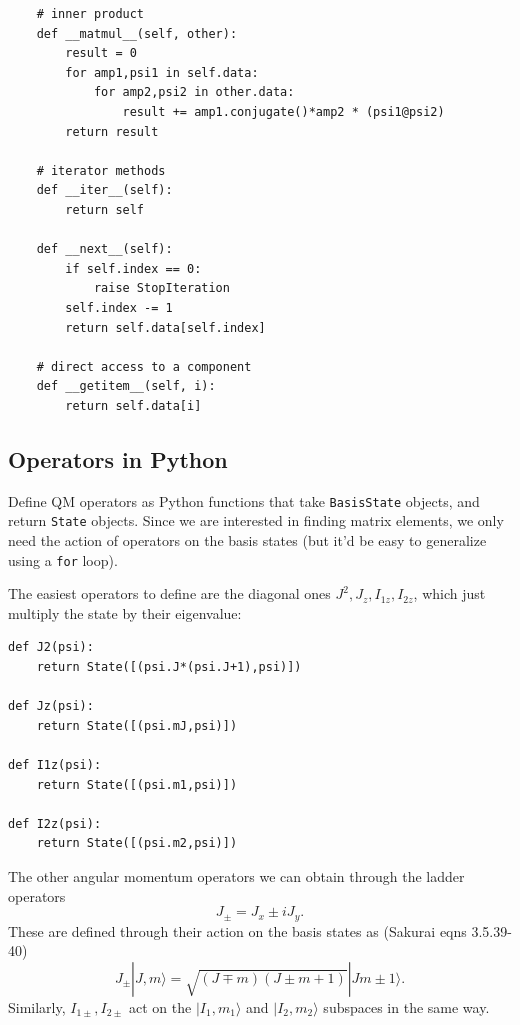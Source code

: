 \begin{lstlisting}
    # inner product
    def __matmul__(self, other):
        result = 0
        for amp1,psi1 in self.data:
            for amp2,psi2 in other.data:
                result += amp1.conjugate()*amp2 * (psi1@psi2)
        return result

    # iterator methods
    def __iter__(self):
        return self
    
    def __next__(self):
        if self.index == 0:
            raise StopIteration
        self.index -= 1
        return self.data[self.index]
    
    # direct access to a component
    def __getitem__(self, i):
        return self.data[i]
\end{lstlisting}

\subsection{Operators in Python}

Define QM operators as Python functions that take \verb`BasisState` objects, and
return \verb`State` objects. Since we are interested in finding matrix elements,
we only need the action of operators on the basis states (but it'd be easy to
generalize using a \verb`for` loop).

The easiest operators to define are the diagonal ones $J^2, J_z, I_{1z},
I_{2z}$, which just multiply the state by their eigenvalue:

\begin{lstlisting}
def J2(psi):
    return State([(psi.J*(psi.J+1),psi)])

def Jz(psi):
    return State([(psi.mJ,psi)])

def I1z(psi):
    return State([(psi.m1,psi)])

def I2z(psi):
    return State([(psi.m2,psi)])
\end{lstlisting}

The other angular momentum operators we can obtain through the ladder operators
%
$$ J_\pm=J_x\pm iJ_y. $$
%
These are defined through their action on the basis states as (Sakurai
\cite{sakurai2011modern} eqns 3.5.39-40)
%
$$ J_\pm|J,m\rangle=\sqrt{(J\mp m)(J\pm m+1)}|Jm\pm1\rangle. $$
%
Similarly, $I_{1\pm},I_{2\pm}$ act on the $|I_1,m_1\rangle$ and
$|I_2,m_2\rangle$ subspaces in the same way.

